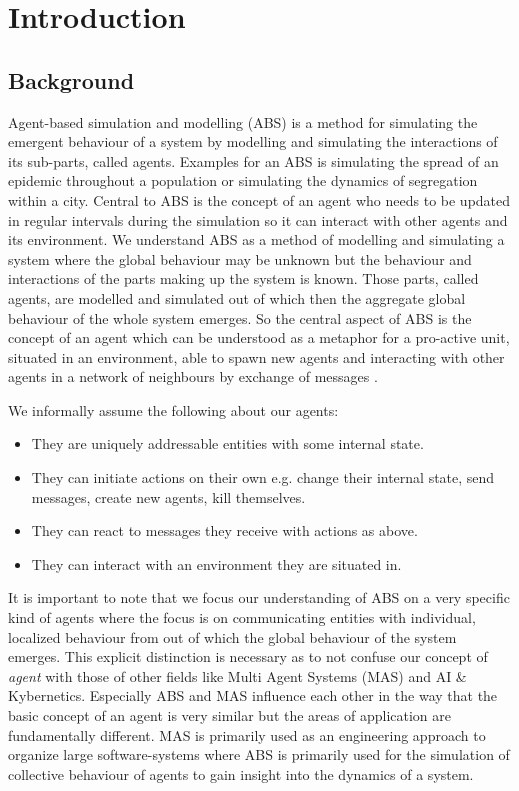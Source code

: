 \chapter{Introduction}
\label{chap:intro}

\section{Background}
Agent-based simulation and modelling (ABS) is a method for simulating the emergent behaviour of a system by modelling and simulating the interactions of its sub-parts, called agents. Examples for an ABS is simulating the spread of an epidemic throughout a population or simulating the dynamics of segregation within a city. Central to ABS is the concept of an agent who needs to be updated in regular intervals during the simulation so it can interact with other agents and its environment.
We understand ABS as a method of modelling and simulating a system where the global behaviour may be unknown but the behaviour and interactions of the parts making up the system is known. Those parts, called agents, are modelled and simulated out of which then the aggregate global behaviour of the whole system emerges. So the central aspect of ABS is the concept of an agent which can be understood as a metaphor for a pro-active unit, situated in an environment, able to spawn new agents and interacting with other agents in a network of neighbours by exchange of messages \cite{wooldridge_introduction_2009}. 

We informally assume the following about our agents:

\begin{itemize}
	\item They are uniquely addressable entities with some internal state.
	\item They can initiate actions on their own e.g. change their internal state, send messages, create new agents, kill themselves.
	\item They can react to messages they receive with actions as above.
	\item They can interact with an environment they are situated in.
\end{itemize} 

It is important to note that we focus our understanding of ABS on a very specific kind of agents where the focus is on communicating entities with individual, localized behaviour from out of which the global behaviour of the system emerges. This explicit distinction is necessary as to not confuse our concept of \textit{agent} with those of other fields like Multi Agent Systems (MAS) and AI \& Kybernetics. Especially ABS and MAS influence each other in the way that the basic concept of an agent is very similar but the areas of application are fundamentally different. MAS is primarily used as an engineering approach to organize large software-systems where ABS is primarily used for the simulation of collective behaviour of agents to gain insight into the dynamics of a system.

